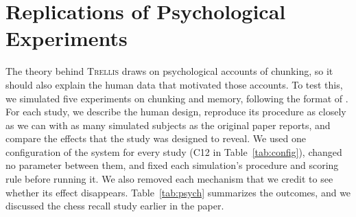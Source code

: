 \documentclass[11pt,letterpaper]{article}
\newcommand{\trellis}{\textsc{Trellis}}
\begin{document}
\section{Replications of Psychological Experiments}

The theory behind \trellis{} draws on psychological accounts of chunking, so it should
also explain the human data that motivated those accounts. To test this, we simulated
five experiments on chunking and memory, following the format of
\citet{maclellan-categorization}. For each study, we describe the human design,
reproduce its procedure as closely as we can with as many simulated subjects as the
original paper reports, and compare the effects that the study was designed to reveal.
We used one configuration of the system for every study (C12 in Table~\ref{tab:config}),
changed no parameter between them, and fixed each simulation's procedure and scoring
rule before running it. We also removed each mechanism that we credit to see whether
its effect disappears. Table~\ref{tab:psych} summarizes the outcomes, and we discussed
the chess recall study earlier in the paper.
\end{document}
